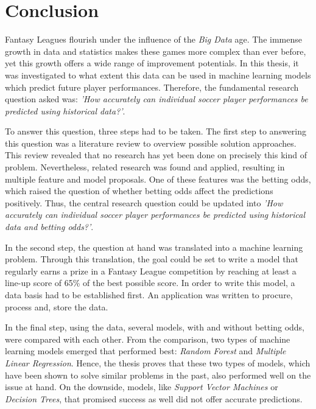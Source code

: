 \chapter{Conclusion}

Fantasy Leagues flourish under the influence of the \emph{Big Data} age. The immense growth in data and statistics makes these games more complex than ever before, yet this growth offers a wide range of improvement potentials. In this thesis, it was investigated to what extent this data can be used in machine learning models which predict future player performances. Therefore, the fundamental research question asked was: \emph{'How accurately can individual soccer player performances be predicted using historical data?'}.

To answer this question, three steps had to be taken. The first step to answering this question was a literature review to overview possible solution approaches. This review revealed that no research has yet been done on precisely this kind of problem. Nevertheless, related research was found and applied, resulting in multiple feature and model proposals. One of these features was the betting odds, which raised the question of whether betting odds affect the predictions positively. Thus, the central research question could be updated into \emph{'How accurately can individual soccer player performances be predicted using historical data and betting odds?'}.

In the second step, the question at hand was translated into a machine learning problem. Through this translation, the goal could be set to write a model that regularly earns a prize in a Fantasy League competition by reaching at least a line-up score of 65\% of the best possible score. In order to write this model, a data basis had to be established first. An application was written to procure, process and, store the data.

\clearpage In the final step, using the data, several models, with and without betting odds, were compared with each other. From the comparison, two types of machine learning models emerged that performed best: \emph{Random Forest} and \emph{Multiple Linear Regression}. Hence, the thesis proves that these two types of models, which have been shown to solve similar problems in the past, also performed well on the issue at hand. On the downside, models, like \emph{Support Vector Machines} or \emph{Decision Trees}, that promised success as well did not offer accurate predictions. 

